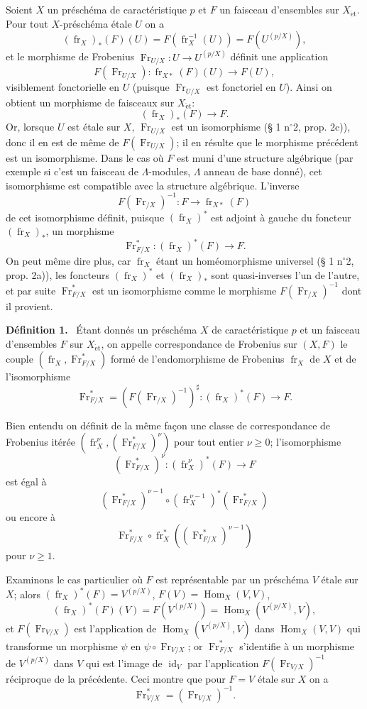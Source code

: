 \documentclass[11pt]{article}
\newenvironment{statement}[1]{\par\medskip\noindent\textbf{#1.}\ }{\par\medskip}
\DeclareMathOperator{\Hom}{Hom}
\providecommand{\et}{\mathrm{\acute{e}t}}
\providecommand{\id}{\operatorname{id}}
\providecommand{\Hom}{\operatorname{Hom}}
\providecommand{\id}{\operatorname{id}}
\providecommand{\id}{\operatorname{id}}
\providecommand{\id}{\operatorname{id}}
\providecommand{\id}{\operatorname{id}}
\providecommand{\Hom}{\operatorname{Hom}}
\providecommand{\fr}{\operatorname{fr}}
\providecommand{\Fr}{\operatorname{Fr}}
\providecommand{\Fr}{\operatorname{Fr}}
\providecommand{\fr}{\operatorname{fr}}
\providecommand{\id}{\operatorname{id}}
\providecommand{\et}{\acute{e}t}
\begin{document}
Soient $X$ un préschéma de caractéristique $p$ et $F$ un faisceau d'ensembles sur $X_{\et}$. Pour tout $X$-préschéma étale $U$ on a
\[
(\fr_X)_*(F)(U)=F(\fr_X^{-1}(U))=F(U^{(p/X)}),
\]
et le morphisme de Frobenius $\Fr_{U/X}:U\to U^{(p/X)}$ définit une application
\[
F(\Fr_{U/X}):\fr_{X*}(F)(U)\longrightarrow F(U),
\]
visiblement fonctorielle en $U$ (puisque $\Fr_{U/X}$ est fonctoriel en $U$). Ainsi on obtient un morphisme de faisceaux sur $X_{\et}$:
\[
(\fr_X)_*(F)\longrightarrow F.
\]
Or, lorsque $U$ est étale sur $X$, $\Fr_{U/X}$ est un isomorphisme (§ 1 n$^\circ$2, prop. 2c)), donc il en est de même de $F(\Fr_{U/X})$; il en résulte que le morphisme précédent est un isomorphisme. Dans le cas où $F$ est muni d'une structure algébrique (par exemple si c'est un faisceau de $\Lambda$-modules, $\Lambda$ anneau de base donné), cet isomorphisme est compatible avec la structure algébrique. L'inverse
\[
F(\Fr_{/X})^{-1}:F\longrightarrow \fr_{X*}(F)
\]
de cet isomorphisme définit, puisque $(\fr_X)^*$ est adjoint à gauche du foncteur $(\fr_X)_*$, un morphisme
\[
\Fr^*_{F/X}:(\fr_X)^*(F)\longrightarrow F.
\]
On peut même dire plus, car $\fr_X$ étant un homéomorphisme universel (§ 1 n$^\circ$2, prop. 2a)), les foncteurs $(\fr_X)^*$ et $(\fr_X)_*$ sont quasi-inverses l'un de l'autre, et par suite $\Fr^*_{F/X}$ est un isomorphisme comme le morphisme $F(\Fr_{/X})^{-1}$ dont il provient.

\begin{statement}{Définition 1}
Étant donnés un préschéma $X$ de caractéristique $p$ et un faisceau d'ensembles $F$ sur $X_{\et}$, on appelle correspondance de Frobenius sur $(X,F)$ le couple $(\fr_X,\Fr^*_{F/X})$ formé de l'endomorphisme de Frobenius $\fr_X$ de $X$ et de l'isomorphisme
\[
\Fr^*_{F/X}=(F(\Fr_{/X})^{-1})^\sharp:(\fr_X)^*(F)\longrightarrow F.
\]
\end{statement}

Bien entendu on définit de la même façon une classe de correspondance de Frobenius itérée $(\fr_X^\nu,(\Fr^*_{F/X})^\nu)$ pour tout entier $\nu\geq0$; l'isomorphisme
\[
(\Fr^*_{F/X})^\nu:(\fr_X^\nu)^*(F)\longrightarrow F
\]
est égal à
\[
(\Fr^*_{F/X})^{\nu-1}\circ (\fr_X^{\nu-1})^*(\Fr^*_{F/X})
\]
ou encore à
\[
\Fr^*_{F/X}\circ\fr_X^*((\Fr^*_{F/X})^{\nu-1})
\]
pour $\nu\geq1$.

Examinons le cas particulier où $F$ est représentable par un préschéma $V$ étale sur $X$; alors $(\fr_X)^*(F)=V^{(p/X)}$, $F(V)=\Hom_X(V,V)$,
\[
(\fr_X)^*(F)(V)=F(V^{(p/X)})=\Hom_X(V^{(p/X)},V),
\]
et $F(\Fr_{V/X})$ est l'application de $\Hom_X(V^{(p/X)},V)$ dans $\Hom_X(V,V)$ qui transforme un morphisme $\psi$ en $\psi\circ\Fr_{V/X}$; or $\Fr^*_{F/X}$ s'identifie à un morphisme de $V^{(p/X)}$ dans $V$ qui est l'image de $\id_V$ par l'application $F(\Fr_{V/X})^{-1}$ réciproque de la précédente. Ceci montre que pour $F=V$ étale sur $X$ on a
\[
\Fr^*_{V/X}=(\Fr_{V/X})^{-1}.
\]
\end{document}
